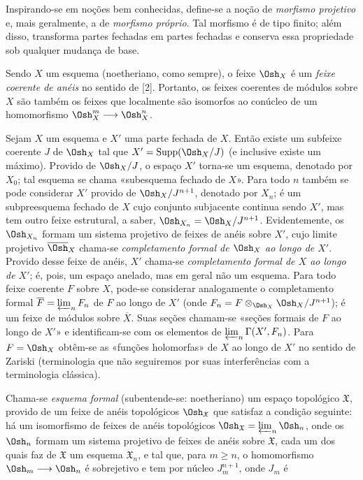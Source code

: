 Inspirando-se em noções bem conhecidas, define-se a noção de
\emph{morfismo projetivo} e, mais geralmente, a de \emph{morfismo próprio}.
Tal morfismo é de tipo finito; além disso, transforma partes fechadas em partes
fechadas e conserva essa propriedade sob qualquer mudança de base.

Sendo $X$ um esquema (noetheriano, como sempre), o feixe $\Osh_X$ é um
\emph{feixe coerente de anéis} no sentido de [2]. Portanto, os feixes
coerentes de módulos sobre $X$ são também os feixes que localmente são
isomorfos ao conúcleo de um homomorfismo
$\Osh_X^{m}\longrightarrow\Osh_X^{n}$.


Sejam $X$ um esquema e $X'$ uma parte fechada de $X$. Então existe um
subfeixe coerente $J$ de $\Osh_X$ tal que
$X'=\operatorname{Supp}(\Osh_X/J)$ (e inclusive existe um máximo). Provido de
$\Osh_X/J$, o espaço $X'$ torna-se um esquema, denotado por $X_0$;
tal esquema se chama «subesquema fechado de $X$». Para todo $n$ também se
pode considerar $X'$ provido de $\Osh_X/J^{n+1}$, denotado por $X_n$;
é um subpreesquema fechado de $X$ cujo conjunto subjacente continua sendo $X'$,
mas tem outro feixe estrutural, a saber,
$\Osh_{X_n}=\Osh_X/J^{n+1}$. Evidentemente, os $\Osh_{X_n}$ formam um sistema
projetivo de feixes de anéis sobre $X'$, cujo limite projetivo
$\overline{\Osh}_X$ chama-se \emph{completamento formal de $\Osh_X$ ao longo
de $X'$}. Provido desse feixe de anéis, $X'$ chama-se \emph{completamento
formal de $X$ ao longo de $X'$}; é, pois, um espaço anelado, mas em
geral não um esquema. Para todo feixe coerente $F$ sobre $X$, pode-se considerar
analogamente o completamento formal $\overline F=\varprojlim_n F_n$ de $F$ ao
longo de $X'$ (onde $F_n=F\otimes_{\Osh_X}\Osh_X/J^{n+1}$); é um feixe de
módulos sobre $\overline X$. Suas seções chamam-se «seções formais de $F$
ao longo de $X'$» e identificam-se com os elementos de
$\varprojlim_n\Gamma(X',F_n)$. Para $F=\Osh_X$ obtêm-se as «funções
holomorfas» de $X$ ao longo de $X'$ no sentido de Zariski (terminologia que
não seguiremos por suas interferências com a terminologia clássica).

Chama-se \emph{esquema formal} (subentende-se: noetheriano) um espaço
topológico $\mathfrak X$, provido de um feixe de anéis topológicos
$\Osh_{\mathfrak X}$ que satisfaz a condição seguinte: há um isomorfismo
de feixes de anéis topológicos
$\Osh_{\mathfrak X}=\varprojlim_n\Osh_n$, onde os $\Osh_n$ formam um sistema
projetivo de feixes de anéis sobre $\mathfrak X$, cada um dos quais faz
de $\mathfrak X$ um esquema $\mathfrak X_n$, e tal que, para $m\geq n$, o
homomorfismo $\Osh_m\longrightarrow\Osh_n$ é sobrejetivo e tem por núcleo
$J_m^{n+1}$, onde $J_m$ é

